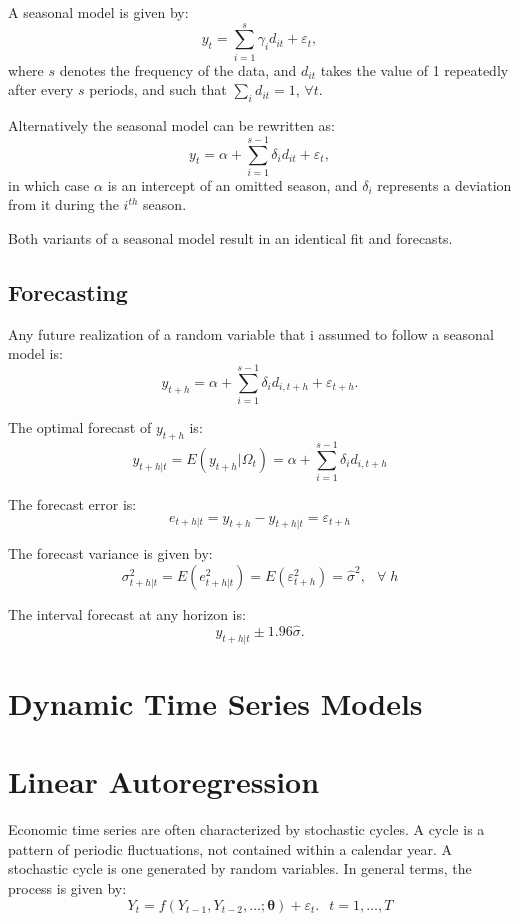 \documentclass[
  oneside]{book}
\begin{document}
A seasonal model is given by: \[y_t = \sum_{i=1}^{s}\gamma_i d_{it} + \varepsilon_t,\]
where \(s\) denotes the frequency of the data, and \(d_{it}\) takes the value of 1 repeatedly after every \(s\) periods, and such that \(\sum_{i} d_{it} = 1\), \(\forall t\).

Alternatively the seasonal model can be rewritten as: \[y_t = \alpha + \sum_{i=1}^{s-1}\delta_i d_{it} + \varepsilon_t,\] in which case \(\alpha\) is an intercept of an omitted season, and \(\delta_i\) represents a deviation from it during the \(i^{th}\) season.

Both variants of a seasonal model result in an identical fit and forecasts.

\hypertarget{forecasting-1}{%
\section{Forecasting}\label{forecasting-1}}

Any future realization of a random variable that i assumed to follow a seasonal model is: \[y_{t+h} = \alpha + \sum_{i=1}^{s-1}\delta_i d_{i,t+h} + \varepsilon_{t+h}.\]

The optimal forecast of \(y_{t+h}\) is: \[y_{t+h|t} = E(y_{t+h}|\Omega_t) = \alpha + \sum_{i=1}^{s-1}\delta_i d_{i,t+h}\]

The forecast error is: \[e_{t+h|t} = y_{t+h} - y_{t+h|t} = \varepsilon_{t+h}\]

The forecast variance is given by: \[\sigma_{t+h|t}^2 = E(e_{t+h|t}^2) =  E(\varepsilon_{t+h}^2) = \hat{\sigma}^2,\;~~\forall\;h\]

The interval forecast at any horizon is: \[y_{t+h|t} \pm 1.96 \hat{\sigma}.\]

\hypertarget{dynamic-time-series-models}{%
\chapter*{Dynamic Time Series Models}\label{dynamic-time-series-models}}

\hypertarget{linear-autoregression}{%
\chapter{Linear Autoregression}\label{linear-autoregression}}

Economic time series are often characterized by stochastic cycles. A cycle is a pattern of periodic fluctuations, not contained within a calendar year. A stochastic cycle is one generated by random variables. In general terms, the process is given by:
\[Y_t = f(Y_{t-1},Y_{t-2},\ldots;\mathbf{\theta})+\varepsilon_t.\;~~t=1,\ldots,T\]
\end{document}
